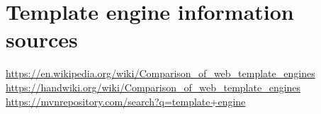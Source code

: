 \chapter{Template engine information sources}
\label{appendix:sources}

\url{https://en.wikipedia.org/wiki/Comparison_of_web_template_engines}
\url{https://handwiki.org/wiki/Comparison_of_web_template_engines}
\url{https://mvnrepository.com/search?q=template+engine}
